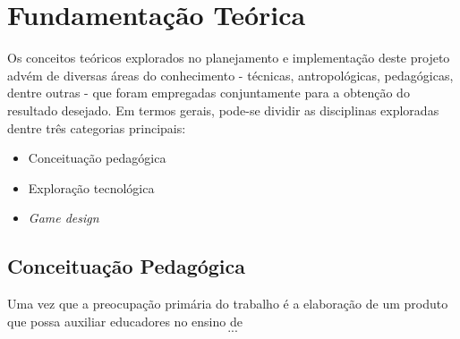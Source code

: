 
\chapter{Fundamentação Teórica}\label{cap-fundamentacao}

Os conceitos teóricos explorados no planejamento e implementação deste projeto 
advém de diversas áreas do conhecimento - técnicas, antropológicas, 
pedagógicas, dentre outras - que foram empregadas conjuntamente para a 
obtenção do resultado desejado. Em termos gerais, pode-se dividir as 
disciplinas exploradas dentre três categorias principais:

\begin{itemize}[label={--},noitemsep,topsep=0pt,leftmargin=4mm]
	\item Conceituação pedagógica
	\item Exploração tecnológica
	\item \textit{Game design}
\end{itemize}
 
\section{Conceituação Pedagógica}\label{sec-fund-conceituacao-pedagogica}

Uma vez que a preocupação primária do trabalho é a elaboração de um produto 
que possa auxiliar educadores no ensino de \[...\]

